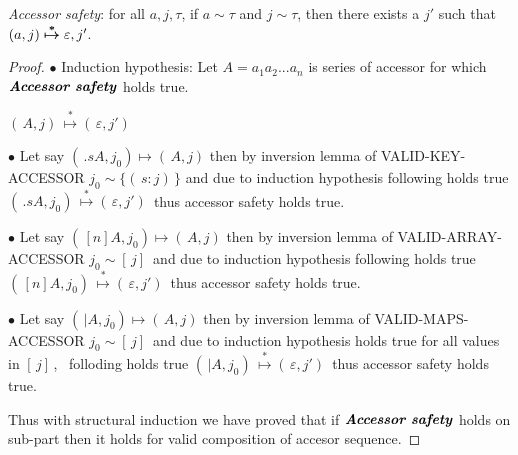 \documentclass[11pt]{article}
\newcommand{\matches}[2]{{#1}\sim{#2}}   %
\newcommand{\aeps}{\varepsilon}          %
\begin{document}
\textit{Accessor safety}: for all $a, j, \tau$, if $\matches{a}{\tau}$ and $\matches{j}{\tau}$, then there exists a $j'$ such that $\evals{(a, j)}{\aeps, j'}$.

\begin{proof}
$\bullet$ Induction hypothesis: Let ${A = a_1 a_2 ... a_n}$ is series of accessor  for which $\textbf{\emph{Accessor safety}}$ holds true.


$(\, A, j)\, \overset{*}{\mapsto} (\, \aeps, j')\,$

$\bullet$ Let say $(\, .sA, j_0) \mapsto (\, A, j) $ then by inversion lemma of VALID-KEY-ACCESSOR $\matches{j_0}{ \{(\,s:j)\,\}} $ and due to induction hypothesis following holds true
$(\, .sA, j_0)\, \overset{*}{\mapsto} (\, \aeps, j')\,$ thus accessor safety holds true.

$\bullet$ Let say $(\, [n]A, j_0) \mapsto (\, A, j) $ then by inversion lemma of VALID-ARRAY-ACCESSOR $\matches{j_0}{ [\, j ]\,} $ and due to induction hypothesis following holds true
$(\, [n]A, j_0)\, \overset{*}{\mapsto} (\, \aeps, j')\,$ thus accessor safety holds true.

$\bullet$ Let say $(\, |A, j_0) \mapsto (\, A, j) $ then by inversion lemma of VALID-MAPS-ACCESSOR $\matches{j_0}{ [\, j ]\,} $ and due to induction hypothesis holds true for all values in $[\, j]\, $, \, folloding holds true
$(\, |A, j_0)\, \overset{*}{\mapsto} (\, \aeps, j')\,$ thus accessor safety holds true.

Thus with structural induction we have proved that if $\textbf{\emph{Accessor safety}}$ holds on sub-part then it holds for valid composition of accesor sequence.





\end{proof}
\end{document}
